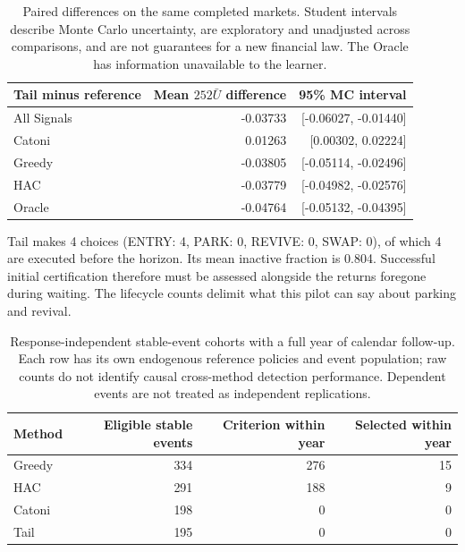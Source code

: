 \begin{table}[H]\centering\small

\begin{tabular}{lrr}

\toprule

Tail minus reference & Mean $252\bar U$ difference & 95\% MC interval \\

\midrule

All Signals & -0.03733 & [-0.06027, -0.01440] \\

Catoni & 0.01263 & [0.00302, 0.02224] \\

Greedy & -0.03805 & [-0.05114, -0.02496] \\

HAC & -0.03779 & [-0.04982, -0.02576] \\

Oracle & -0.04764 & [-0.05132, -0.04395] \\

\bottomrule\end{tabular}

\caption{Paired differences on the same completed markets. Student intervals describe Monte Carlo uncertainty, are exploratory and unadjusted across comparisons, and are not guarantees for a new financial law. The Oracle has information unavailable to the learner.}\end{table}

Tail makes 4 choices (ENTRY: 4, PARK: 0, REVIVE: 0, SWAP: 0), of which 4 are executed before the horizon. Its mean inactive fraction is 0.804. Successful initial certification therefore must be assessed alongside the returns foregone during waiting. The lifecycle counts delimit what this pilot can say about parking and revival.

\begin{table}[H]\centering\small

\begin{tabular}{lrrr}

\toprule

Method & Eligible stable events & Criterion within year & Selected within year \\

\midrule

Greedy & 334 & 276 & 15 \\

HAC & 291 & 188 & 9 \\

Catoni & 198 & 0 & 0 \\

Tail & 195 & 0 & 0 \\

\bottomrule\end{tabular}

\caption{Response-independent stable-event cohorts with a full year of calendar follow-up. Each row has its own endogenous reference policies and event population; raw counts do not identify causal cross-method detection performance. Dependent events are not treated as independent replications.}\end{table}

